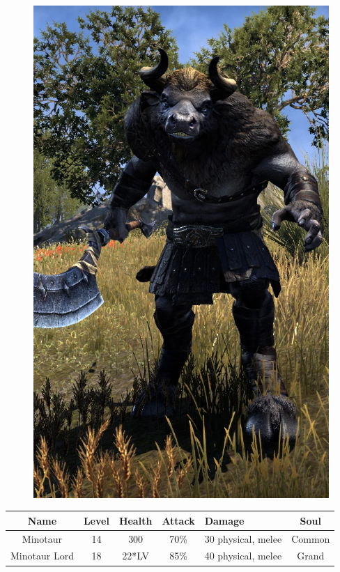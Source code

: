 \documentclass[12pt]{book}
\begin{document}
\begin{figure}[h]
	\centering
	\includegraphics[scale=0.3]{minotaur.png}
\end{figure}

\begin{tabular}{|c|c|c|c|p{}|c|}
\hline
Name & Level & Health & Attack & Damage & Soul\\ \hline
Minotaur & 14 & 300 & 70\% & 30 physical, melee & Common\\ \hline
Minotaur Lord & 18 & 22*LV & 85\% & 40 physical, melee & Grand\\ \hline
\end{tabular}\\
\end{document}
